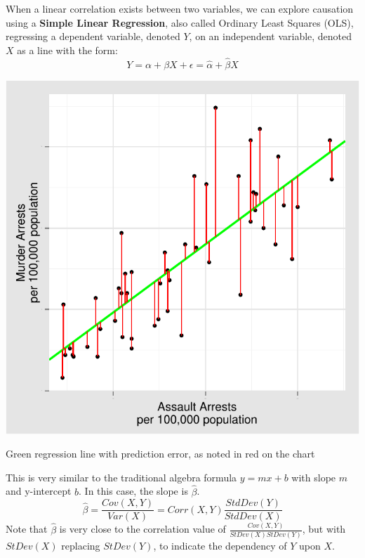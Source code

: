 \documentclass[nohyper,justified]{tufte-handout}\usepackage[]{graphicx}\usepackage[]{color}
\makeatletter
\def\maxwidth{ %
  \ifdim\Gin@nat@width>\linewidth
    \linewidth
  \else
    \Gin@nat@width
  \fi
}
\newenvironment{knitrout}{}{} %
\makeatother
\begin{document}
When a linear correlation exists between two variables, we can explore causation using a \textbf{Simple Linear Regression}, also called Ordinary Least Squares (OLS), regressing a dependent variable, denoted $Y$, on an independent variable, denoted $X$ as a line with the form:
\begin{equation*}
Y=\alpha + {\beta}X +{\epsilon}=\hat{\alpha} + \hat{\beta}X 
\end{equation*}
\begin{knitrout}
\color{fgcolor}\begin{marginfigure}

{\centering \includegraphics[width=\maxwidth]{figure/graphics-ols-1} 

}

\caption[Green regression line with prediction error, as noted in red on the chart]{Green regression line with prediction error, as noted in red on the chart}\label{fig:ols}
\end{marginfigure}


\end{knitrout}
This is very similar to the traditional algebra formula $y=mx+b$ with slope $m$ and y-intercept $b$. In this case, the slope is $\hat{\beta}$.
\begin{equation*}
\hat{\beta}=\frac{Cov(X,Y)}{Var(X)}=Corr(X,Y)\frac{StdDev(Y)}{StdDev(X)}
\end{equation*}
Note that $\hat{\beta}$ is very close to the correlation value of $\frac{Cov(X,Y)}{StDev(X)StDev(Y)}$, but with $StDev(X)$ replacing $StDev(Y)$, to indicate the dependency of $Y$ upon $X$.
\end{document}
